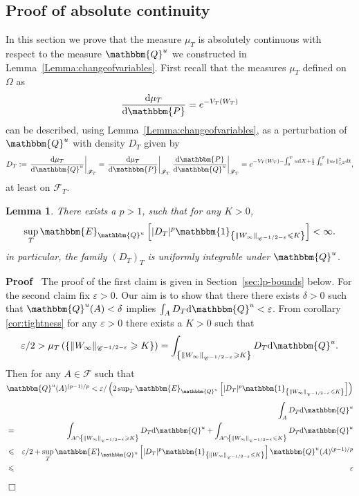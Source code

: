 \documentclass[11pt]{article}
\newcommand{\assign}{:=}
\newcommand{\mathd}{\mathrm{d}}
\newenvironment{proof}{\noindent\textbf{Proof\ }}{\hspace*{\fill}$\Box$\medskip}
\newtheorem{lemma}{Lemma}
\newcommand{\VV}{\mathscr{C}}
\newcommand{\CF}{\mathscr{F}}
\begin{document}
\subsection{Proof of absolute continuity}

In this section we prove that the measure $\mu_T$ is absolutely continuous
with respect to the measure $\mathbbm{Q}^u$ we constructed in
Lemma~\ref{Lemma:changeofvariables}. First recall that the measures $\mu_T$
defined on $\Omega$ as
\[ \frac{\mathd \mu_T}{\mathd \mathbbm{P}} = e^{- V_T (W_T)} \]
can be described, using Lemma~\ref{Lemma:changeofvariables}, as a perturbation
of $\mathbbm{Q}^u$ with density $D_T$ given by
\[ D_T \assign \left. \frac{\mathd \mu_T}{\mathd \mathbbm{Q}^u}
   \right|_{\CF_T} = \left. \frac{\mathd \mu_T}{\mathd \mathbbm{P}}
   \right|_{\CF_T} \left. \frac{\mathd \mathbbm{P}}{\mathd \mathbbm{Q}^u}
   \right|_{\CF_T} = e^{- V_T (W_T) - \int^T_0 u \mathd X + \frac{1}{2}
   \int^T_0 \| u_t \|^2_{L^2} \mathd t}, \]
at least on $\CF_T$.

\begin{lemma}
  \label{lemma:localestimate}There exists a $p > 1$, such that for any $K >
  0$,
  \[ \sup_T \mathbbm{E}_{\mathbbm{Q}^u} \left[ | D_T |^p \mathbbm{1}_{\left\{
     \| W_{\infty} \|_{\VV^{- 1 / 2 - \varepsilon}} \leqslant K \right\}}
     \right] < \infty . \]
  in particular, the family $(D_T)_T$ is uniformly integrable under
  $\mathbbm{Q}^u$.
\end{lemma}

\begin{proof}
  The proof of the first claim is given in Section~\ref{sec:lp-bounds} below.
  For the second claim fix $\varepsilon > 0$. Our aim is to show that there
  there exists $\delta > 0$ such that $\mathbbm{Q}^u (A) < \delta$ implies
  $\int_A D_T \mathd \mathbbm{Q}^u < \varepsilon$. From corollary
  \ref{cor:tightness} for any $\varepsilon > 0$ there exists a $K > 0$ such
  that
  \[ \varepsilon / 2 > \mu_T \left( \left\{ \| W_{\infty} \|_{\VV^{- 1 / 2 -
     \varepsilon}} \geqslant K \right\} \right) = \int_{\left\{ \| W_{\infty}
     \|_{\VV^{- 1 / 2 - \varepsilon}} \geqslant K \right\}} D_T \mathd
     \mathbbm{Q}^u . \]
  Then for any $A \in \CF$ such that $\mathbbm{Q}^u (A)^{(p - 1) / p} <
  \varepsilon / \left( 2 \sup_T \mathbbm{E}_{\mathbbm{Q}^u} \left[ | D_T |^p
  \mathbbm{1}_{\left\{ \| W_{\infty} \|_{\VV^{- 1 / 2 - \varepsilon}}
  \leqslant K \right\}} \right] \right)$
  \begin{eqnarray*}
    &  & \int_A D_T \mathd \mathbbm{Q}^u\\
    & = & \int_{A \cap \left\{ \| W_{\infty} \|_{\VV^{- 1 / 2 - \varepsilon}}
    \geqslant K \right\}} D_T \mathd \mathbbm{Q}^u + \int_{A \cap \left\{ \|
    W_{\infty} \|_{\VV^{- 1 / 2 - \varepsilon}} \leqslant K \right\}} D_T
    \mathd \mathbbm{Q}^u\\
    & \leqslant & \varepsilon / 2 + \sup_T \mathbbm{E}_{\mathbbm{Q}^u} \left[
    | D_T |^p \mathbbm{1}_{\left\{ \| W_{\infty} \|_{\VV^{- 1 / 2 -
    \varepsilon}} \leqslant K \right\}} \right] \mathbbm{Q}^u (A)^{(p - 1) /
    p}\\
    & \leqslant & \varepsilon
  \end{eqnarray*}
\end{proof}
\end{document}
